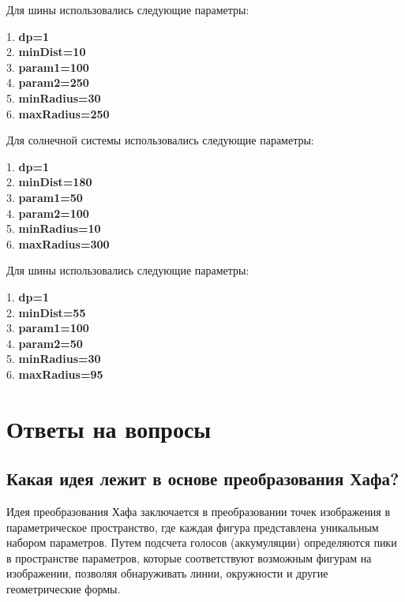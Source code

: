 \documentclass[a4paper, 16pt]{article}
\begin{document}
    \noindent Для шины использовались следующие параметры:
    \begin{center}
        1. \textbf{dp=1}\\
        2. \textbf{minDist=10}\\
        3. \textbf{param1=100}\\
        4. \textbf{param2=250}\\
        5. \textbf{minRadius=30}\\
        6. \textbf{maxRadius=250}
    \end{center}


    \noindent Для солнечной системы использовались следующие параметры:
    \begin{center}
        1. \textbf{dp=1}\\
        2. \textbf{minDist=180}\\
        3. \textbf{param1=50}\\
        4. \textbf{param2=100}\\
        5. \textbf{minRadius=10}\\
        6. \textbf{maxRadius=300}
    \end{center}

    
    \noindent Для шины использовались следующие параметры:
    \begin{center}
        1. \textbf{dp=1}\\
        2. \textbf{minDist=55}\\
        3. \textbf{param1=100}\\
        4. \textbf{param2=50}\\
        5. \textbf{minRadius=30}\\
        6. \textbf{maxRadius=95}
    \end{center}


    \section{Ответы на вопросы}
    \subsection{Какая идея лежит в основе преобразования Хафа?}
    \noindent Идея преобразования Хафа заключается в преобразовании точек изображения
    в параметрическое пространство, где каждая фигура представлена уникальным набором параметров.
    Путем подсчета голосов (аккумуляции) определяются пики в пространстве параметров, которые соответствуют
    возможным фигурам на изображении, позволяя обнаруживать линии, окружности и другие геометрические формы.
\end{document}
